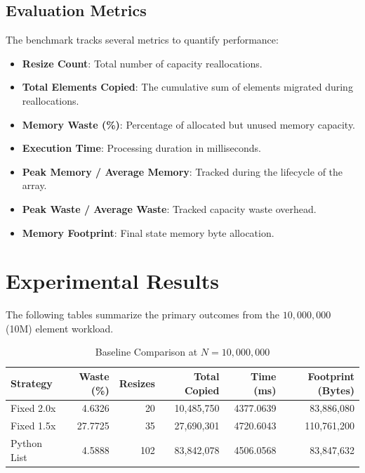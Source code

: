 \documentclass[11pt, a4paper]{article}
\begin{document}
\subsection{Evaluation Metrics}
The benchmark tracks several metrics to quantify performance:
\begin{itemize}
    \item \textbf{Resize Count}: Total number of capacity reallocations.
    \item \textbf{Total Elements Copied}: The cumulative sum of elements migrated during reallocations.
    \item \textbf{Memory Waste (\%)}: Percentage of allocated but unused memory capacity.
    \item \textbf{Execution Time}: Processing duration in milliseconds.
    \item \textbf{Peak Memory / Average Memory}: Tracked during the lifecycle of the array.
    \item \textbf{Peak Waste / Average Waste}: Tracked capacity waste overhead.
    \item \textbf{Memory Footprint}: Final state memory byte allocation.
\end{itemize}

\section{Experimental Results}
The following tables summarize the primary outcomes from the $10,000,000$ (10M) element workload.

\begin{table}[H]
\centering
\caption{Baseline Comparison at $N=10,000,000$}
\label{tab:baseline_comparison}
\begin{tabular}{lrrrrr}
\toprule
\textbf{Strategy} & \textbf{Waste (\%)} & \textbf{Resizes} & \textbf{Total Copied} & \textbf{Time (ms)} & \textbf{Footprint (Bytes)} \\
\midrule
Fixed 2.0x & 4.6326 & 20 & 10,485,750 & 4377.0639 & 83,886,080 \\
Fixed 1.5x & 27.7725 & 35 & 27,690,301 & 4720.6043 & 110,761,200 \\
Python List & 4.5888 & 102 & 83,842,078 & 4506.0568 & 83,847,632 \\
\bottomrule
\end{tabular}
\end{table}
\end{document}
